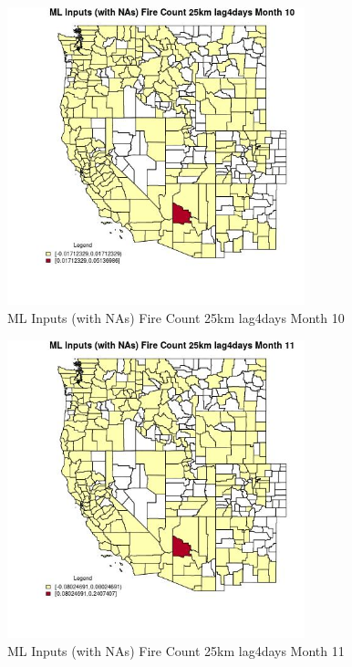 \begin{figure} 
\centering  
\includegraphics[width=0.77\textwidth]{Code_Outputs/Report_ML_input_PM25_Step4_part_e_de_duplicated_aves_compiled_2019-05-20wNAs_CountyFire_Count_25km_lag4daysmedianMonth10.jpg} 
\caption{\label{fig:Report_ML_input_PM25_Step4_part_e_de_duplicated_aves_compiled_2019-05-20wNAsCountyFire_Count_25km_lag4daysmedianMonth10}ML Inputs (with NAs) Fire Count 25km lag4days Month 10} 
\end{figure} 
 

\begin{figure} 
\centering  
\includegraphics[width=0.77\textwidth]{Code_Outputs/Report_ML_input_PM25_Step4_part_e_de_duplicated_aves_compiled_2019-05-20wNAs_CountyFire_Count_25km_lag4daysmedianMonth11.jpg} 
\caption{\label{fig:Report_ML_input_PM25_Step4_part_e_de_duplicated_aves_compiled_2019-05-20wNAsCountyFire_Count_25km_lag4daysmedianMonth11}ML Inputs (with NAs) Fire Count 25km lag4days Month 11} 
\end{figure} 
 

